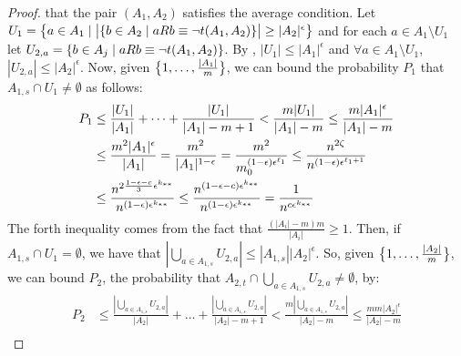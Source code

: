 \begin{lemma}[Claim 4.13]
\begin{proof}
            that the pair $(A_{1}, A_{2})$ satisfies the average condition.
            Let $U_1 = \bigl\{ a \in A_1 \mid \bigl| \{ b \in A_2 \mid a R b \equiv \neg t(A_1, A_2) \} \bigr| \geq |A_2|^\epsilon \bigr\}$
            and for each $a \in A_1 \setminus U_1$ let $U_{2,a} = \{ b \in A_j \mid a R b \equiv \neg t(A_1, A_2) \}$.
            By , $|U_1| \leq |A_1|^\epsilon$ and $\forall a \in A_1 \setminus U_1$,
            $|U_{2,a}| \leq |A_2|^\epsilon$.
            Now, given $\bigl\{ 1, \dots, \frac{|A_1|}{m} \bigr\}$, we can bound the probability $P_1$ that
            $A_{1,s} \cap U_1 \neq \emptyset$ as follows:
            \[
                \begin{split}
                    P_1
                        & \leq \frac{|U_1|}{|A_1|} + \dots + \frac{|U_1|}{|A_1|-m+1}
                            < \frac{m |U_1|}{|A_1| - m}
                            \leq \frac{m |A_1|^\epsilon}{|A_1| - m} \\
                        & \leq \frac{m^2 |A_1|^\epsilon}{|A_1|}
                            = \frac{m^2}{|A_1|^{1-\epsilon}}
                            = \frac{m^2}{m_0^{\parround{1-\epsilon} \epsilon^{\ell_1}}} %
                            \leq \frac{n^{2 \zeta}}{n^{(1-\epsilon)\epsilon^{\ell_1 + 1}}} \\
                        & \leq \frac{n^{2\frac{1-\epsilon-c}{3} \epsilon^{k_{**}}}}{n^{(1-\epsilon)\epsilon^{k_{**}}}}
                            \leq \frac{n^{(1-\epsilon-c) \epsilon^{k_{**}}}}{n^{(1-\epsilon)\epsilon^{k_{**}}}}
                            = \frac{1}{n^{c \epsilon^{k_{**}}}}
                \end{split}
            \]
            The forth inequality comes from the fact that $\frac{(|A_i| - m) m}{|A_i|} \geq 1$.
            Then, if $A_{1,s} \cap U_1= \emptyset$, we have that $|\bigcup_{a \in A_{1,s}} U_{2,a}| \leq |A_{1,s}| |A_2|^\epsilon$.
            So, given $\bigl\{ 1, \dots, \frac{|A_2|}{m} \bigr\}$, we can bound $P_2$, the probability that
            $A_{2,t} \cap \bigcup_{a \in A_{1,s}} U_{2,a} \neq \emptyset$, by:
            \[
                \begin{split}
                    P_2
                        & \leq \frac{|\bigcup_{a \in A_{1,s}} U_{2,a}|}{|A_2|} + \dots + \frac{|\bigcup_{a \in A_{1,s}} U_{2,a}|}{|A_2|-m+1}
                            < \frac{m |\bigcup_{a \in A_{1,s}} U_{2,a}|}{|A_2| - m}
                            \leq \frac{m m |A_2|^\epsilon}{|A_2| - m} \\

\end{split}\]
\end{proof}
\end{lemma}

